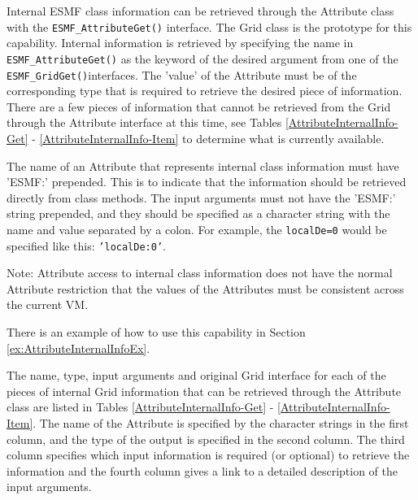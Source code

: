 
\label{sec:InternalInfo}

Internal ESMF class information can be retrieved through the Attribute 
class with the {\tt ESMF\_AttributeGet()} interface.  The Grid class is
the prototype for this capability.  Internal information is retrieved by 
specifying the name in {\tt ESMF\_AttributeGet()} as the keyword of the 
desired argument from one of the {\tt ESMF\_GridGet()}interfaces.  
The 'value' of the Attribute must be of the corresponding type
that is required to retrieve the desired piece of information.  There are 
a few pieces of information that cannot be retrieved from the Grid
through the Attribute interface at this time, see Tables 
\ref{AttributeInternalInfo-Get} - \ref{AttributeInternalInfo-Item} to
determine what is currently available.

The name of an Attribute that represents internal class information must have 
'ESMF:' prepended.  This is to indicate that the information should be retrieved
directly from class methods.  The input arguments must not have the 'ESMF:'
string prepended, and they should be specified as a character string with the name
and value separated by a colon.  For example, the {\tt localDe=0} would be specified 
like this: {\tt 'localDe:0'}.

Note: Attribute access to internal class information does not
have the normal Attribute restriction that the values of the Attributes must be
consistent across the current VM.

There is an example of how to use this capability in Section 
\ref{ex:AttributeInternalInfoEx}.

The name, type, input arguments and original Grid interface for each of the 
pieces of internal Grid information that can be retrieved through the Attribute 
class are listed in Tables \ref{AttributeInternalInfo-Get} - 
\ref{AttributeInternalInfo-Item}.
The name of the Attribute is specified by the character strings in the first 
column, and the type of the output is specified in the second column.
The third column specifies which input information is required (or optional) 
to retrieve the information and the fourth column gives a link to a detailed
description of the input arguments.

